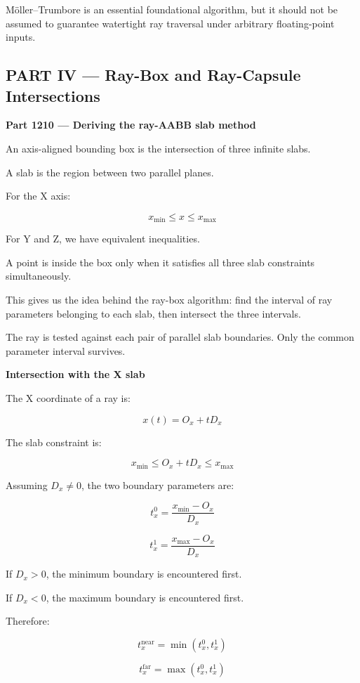 Möller--Trumbore is an essential foundational algorithm, but it should not be assumed to guarantee watertight ray traversal under arbitrary floating-point inputs.

\subsection{PART IV --- Ray-Box and Ray-Capsule Intersections}\label{04-visual-computing-ii-ch024-part-iv-ray-box-and-ray-capsule-intersections}

\textbf{Part 1210 --- Deriving the ray-AABB slab method}

An axis-aligned bounding box is the intersection of three infinite slabs.

A slab is the region between two parallel planes.

For the X axis:

\[
x_{\min}\le x\le x_{\max}
\]

For Y and Z, we have equivalent inequalities.

A point is inside the box only when it satisfies all three slab constraints simultaneously.

This gives us the idea behind the ray-box algorithm: find the interval of ray parameters belonging to each slab, then intersect the three intervals.

The ray is tested against each pair of parallel slab boundaries. Only the common parameter interval survives.

\textbf{Intersection with the X slab}

The X coordinate of a ray is:

\[
x(t)=O_x+tD_x
\]

The slab constraint is:

\[
x_{\min}\le O_x+tD_x\le x_{\max}
\]

Assuming \(D_x\ne0\), the two boundary parameters are:

\[
\boxed{ t_x^0=\frac{x_{\min}-O_x}{D_x} }
\]

\[
\boxed{ t_x^1=\frac{x_{\max}-O_x}{D_x} }
\]

If \(D_x>0\), the minimum boundary is encountered first.

If \(D_x<0\), the maximum boundary is encountered first.

Therefore:

\[
\boxed{ t_x^{\mathrm{near}}=\min(t_x^0,t_x^1) }
\]

\[
\boxed{ t_x^{\mathrm{far}}=\max(t_x^0,t_x^1) }
\]


